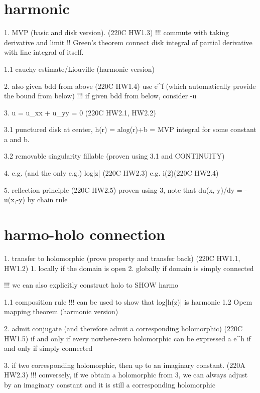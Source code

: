 \section*{harmonic}
1. MVP (basic and disk version).  (220C HW1.3)
	!!! commute with taking derivative and limit
	!! Green's theorem connect disk integral of partial derivative with line integral of itself.

	1.1 cauchy estimate/Liouville (harmonic version)

2. also given bdd from above (220C HW1.4)
	use e^f (which automatically provide the bound from below)
	!!! if given bdd from below, consider -u


3. \Delta u = u_{xx} + u_{yy} = 0		(220C HW2.1, HW2.2)
	
	3.1 punctured disk at center, h(r) = alog(r)+b = MVP integral for some constant a and b.
	
	3.2 removable singularity fillable (proven using 3.1 and CONTINUITY)

4. e.g. (and the only e.g.) log|z| (220C HW2.3)
	e.g. i(2\pi)\theta   (220C HW2.4)


5. reflection principle (220C HW2.5)
	proven using 3, note that du(x,-y)/dy = -u(x,-y) by chain rule




\section*{harmo-holo connection}
1. transfer to holomorphic (prove property and transfer back) (220C HW1.1, HW1.2)		
	1. locally if the domain is open
	2. globally if domain is simply connected
	
	!!! we can also explicitly construct holo to SHOW harmo

	1.1 composition rule
		!!! can be used to show that log|h(z)| is harmonic
	1.2 Opem mapping theorem (harmonic version)



2. admit conjugate (and therefore admit a corresponding holomorphic) (220C HW1.5)
if and only if every nowhere-zero holomorphic can be expressed a e^h 
if and only if simply connected



3. if two corresponding holomorphic, then up to an imaginary constant. (220A HW2.3)
	!!! conversely, if we obtain a holomorphic from 3, we can always adjust by an imaginary constant and it is still a corresponding holomorphic








